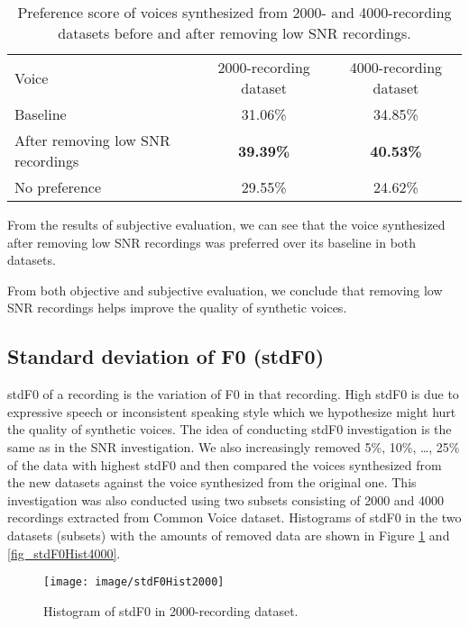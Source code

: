 \documentclass[12pt]{article}
\begin{document}
\begin{table}[]
\begin{center}
\caption{Preference score of voices synthesized from 2000- and 4000-recording datasets before and after removing low SNR recordings.}
\label{tab_subEvaSnr}
\vspace{3mm}
\begin{tabular}{lcc}
\hline
Voice & 2000-recording dataset & 4000-recording dataset \\
\cmidrule(l{0pt}r{2pt}){1-1}\cmidrule(l{0pt}r{2pt}){2-2}\cmidrule(l{0pt}r{2pt}){3-3}
Baseline          & 31.06\% & 34.85\% \\
After removing low SNR recordings  & \textbf{39.39\%} & \textbf{40.53\%} \\
No preference & 29.55\% & 24.62\% \\
\hline
\end{tabular}
\end{center}
\end{table}

From the results of subjective evaluation, we can see that the voice synthesized after removing low SNR recordings was preferred over its baseline in both datasets.

From both objective and subjective evaluation, we conclude that removing low SNR recordings helps improve the quality of synthetic voices.

\subsection{Standard deviation of F0 (stdF0)}
stdF0 of a recording is the variation of F0 in that recording. High stdF0 is due to expressive speech or inconsistent speaking style which we hypothesize might hurt the quality of synthetic voices. The idea of conducting stdF0 investigation is the same as in the SNR investigation. We also increasingly removed 5\%, 10\%, …, 25\% of the data with highest stdF0 and then compared the voices synthesized from the new datasets against the voice synthesized from the original one. This investigation was also conducted using two subsets consisting of 2000 and 4000 recordings extracted from Common Voice dataset. Histograms of stdF0 in the two datasets (subsets) with the amounts of removed data are shown in Figure \ref{fig_stdF0Hist2000} and \ref{fig_stdF0Hist4000}.

\begin{figure}[t]
\begin{center}
\texttt{[image: image/stdF0Hist2000]}
\end{center}
\vspace{-0.3cm}
\caption[Histogram of stdF0 in 2000-recording dataset.]{Histogram of stdF0 in 2000-recording dataset.}
\label{fig_stdF0Hist2000}
\end{figure}
\end{document}
